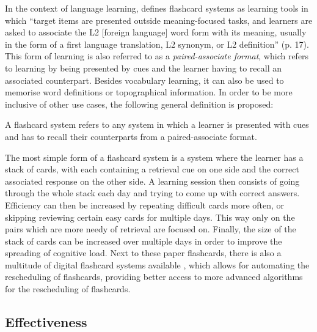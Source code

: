 In the context of language learning,  defines flashcard systems as learning tools in which ``target items are presented outside meaning-focused tasks, and learners are asked to associate the L2 [foreign language] word form with its meaning, usually in the form of a first language translation, L2 synonym, or L2 definition'' (p. 17). This form of learning is also referred to as a \emph{paired-associate format}, which refers to learning by being presented by cues and the learner having to recall an associated counterpart. Besides vocabulary learning, it can also be used to memorise word definitions or topographical information. In order to be more inclusive of other use cases, the following general definition is proposed:

\begin{definition}
    A flashcard system refers to any system in which a learner is presented with cues and has to recall their counterparts from a paired-associate format.
\end{definition}

The most simple form of a flashcard system is a system where the learner has a stack of cards, with each containing a retrieval cue on one side and the correct associated response on the other side. A learning session then consists of going through the whole stack each day and trying to come up with correct answers. Efficiency can then be increased by repeating difficult cards more often, or skipping reviewing certain easy cards for multiple days. This way only on the pairs which are more needy of retrieval are focused on. Finally, the size of the stack of cards can be increased over multiple days in order to improve the spreading of cognitive load. Next to these paper flashcards, there is also a multitude of digital flashcard systems available \cite{hwang2, nakata, microlearning}, which allows for automating the rescheduling of flashcards, providing better access to more advanced algorithms for the rescheduling of flashcards.

\subsection{Effectiveness}

